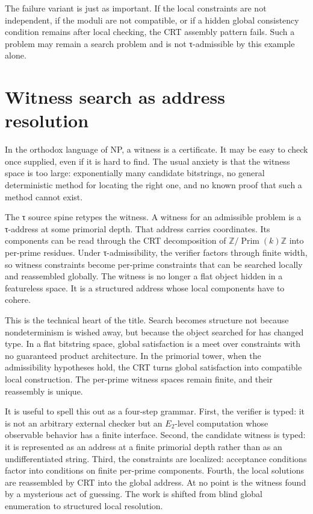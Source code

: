 \documentclass{pantarhei-researchnote}
\newcommand{\Etwo}{\ensuremath{E_2}}
\newcommand{\Prim}{\ensuremath{\operatorname{Prim}}}
\begin{document}
The failure variant is just as important. If the local constraints are not
independent, if the moduli are not compatible, or if a hidden global
consistency condition remains after local checking, the CRT assembly
pattern fails. Such a problem may remain a search problem and is not
τ-admissible by this example alone.

\section{Witness search as address resolution}
\label{sec:witness-search}

In the orthodox language of NP, a witness is a certificate. It may be easy
to check once supplied, even if it is hard to find. The usual anxiety is
that the witness space is too large: exponentially many candidate
bitstrings, no general deterministic method for locating the right one,
and no known proof that such a method cannot exist.

The τ source spine retypes the witness. A witness for an admissible
problem is a τ-address at some primorial depth. That address carries
coordinates. Its components can be read through the CRT decomposition of
\(\mathbb{Z}/\Prim(k)\mathbb{Z}\) into per-prime residues. Under
τ-admissibility, the verifier factors through finite width, so witness
constraints become per-prime constraints that can be searched locally and
reassembled globally. The witness is no longer a flat object hidden in a
featureless space. It is a structured address whose local components have
to cohere.

This is the technical heart of the title. Search becomes structure not
because nondeterminism is wished away, but because the object searched for
has changed type. In a flat bitstring space, global satisfaction is a meet
over constraints with no guaranteed product architecture. In the primorial
tower, when the admissibility hypotheses hold, the CRT turns global
satisfaction into compatible local construction. The per-prime witness
spaces remain finite, and their reassembly is unique.

It is useful to spell this out as a four-step grammar. First, the
verifier is typed: it is not an arbitrary external checker but an
\Etwo-level computation whose observable behavior has a finite interface.
Second, the candidate witness is typed: it is represented as an address
at a finite primorial depth rather than as an undifferentiated string.
Third, the constraints are localized: acceptance conditions factor into
conditions on finite per-prime components. Fourth, the local solutions are
reassembled by CRT into the global address. At no point is the witness
found by a mysterious act of guessing. The work is shifted from blind
global enumeration to structured local resolution.
\end{document}
